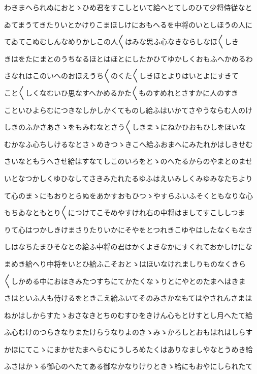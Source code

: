 \documentclass[a4paper,11pt,landscape]{ltjtarticle}
\begin{document}
わきまへられぬにおとゝひめ君をすこしといて給へとてしのひて少将侍従なと
\par\medskip
ゐてまうてきたりいとかけりこまほしけにおもへるを中将のいとしほうの人に
\par\medskip
てゐてこぬむしんなめりかしこの人〱はみな思ふ心なきならしなほ〱しき
\par\medskip
きはをたにまとのうちなるほとはほとにしたかひてゆかしくおもふへかめるわ
\par\medskip
さなれはこのいへのおほえうち〱のくた〱しきほとよりはいとよにすきて
\par\medskip
こと〱しくなむいひ思なすへかめるかた〱ものすめれとさすかに人のすき
\par\medskip
こといひよらむにつきなしかしかくてものし給ふはいかてさやうならむ人のけ
\par\medskip
しきのふかさあさゝをもみむなとさう〱しきまゝにねかひおもひしをほいな
\par\medskip
むかなふ心ちしけるなとさゝめきつゝきこへ給ふおまへにみたれかはしきせむ
\par\medskip
さいなともうへさせ給はすなてしこのいろをとゝのへたるからのやまとのませ
\par\medskip
いとなつかしくゆひなしてさきみたれたるゆふはえいみしくみゆみなたちより
\par\medskip
て心のまゝにもおりとらぬをあかすおもひつゝやすらふいふそくともなりな心
\par\medskip
もちゐなともとり〱につけてこそめやすけれ右の中将はましてすこししつま
\par\medskip
りて心はつかしきけまさりたりいかにそやをとつれきこゆやはしたなくもなさ
\par\medskip
しはなちたまひそなとの給ふ中将の君はかくよきなかにすくれておかしけにな
\par\medskip
まめき給へり中将をいとひ給ふこそおとゝはほいなけれましりものなくきら
\par\medskip
〱しかめる中におほきみたつすちにてかたくなゝりとにやとのたまへはきま
\par\medskip
さはといふ人も侍けるをときこえ給ふいてそのみさかなもてはやされんさまは
\par\medskip
ねかはしからすたゝおさなきとちのむすひをきけん心もとけすとし月へたて給
\par\medskip
ふ心むけのつらきなりまたけらうなりよのきゝみゝかろしとおもはれはしらす
\par\medskip
かほにてこゝにまかせたまへらむにうしろめたくはありなましやなとうめき給
\par\medskip
ふさはかゝる御心のへたてある御なかなりけりときゝ給にもおやにしられたて
\end{document}
